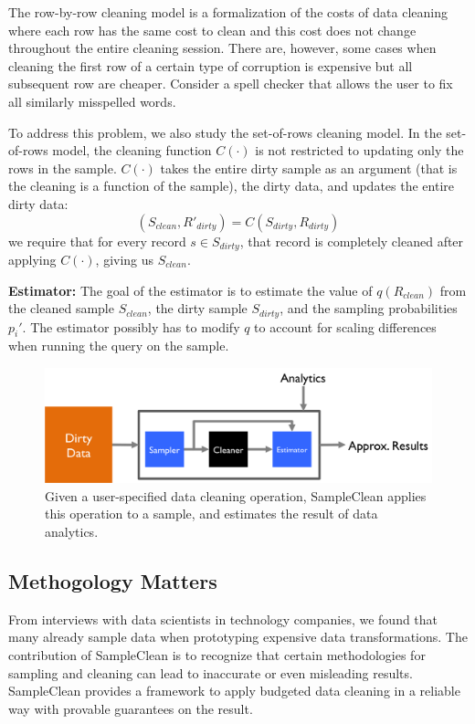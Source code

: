 The row-by-row cleaning model is a formalization of the costs of data cleaning where each row has the same cost to clean and this cost does not change throughout the entire cleaning session.
There are, however, some cases when cleaning the first row of a certain type of corruption is expensive but all subsequent row are cheaper.
Consider a spell checker that allows the user to fix all similarly misspelled words. 

To address this problem, we also study the set-of-rows cleaning model.
In the set-of-rows model, the cleaning function $C(\cdot)$ is not restricted to updating only the rows in the sample.
$C(\cdot)$ takes the entire dirty sample as an argument (that is the cleaning is a function of the sample), the dirty data, and updates the entire dirty data:
\[
(S_{clean}, R'_{dirty}) = C(S_{dirty},R_{dirty})
\]
we require that for every record $s \in S_{dirty}$, that record is completely cleaned after applying $C(\cdot)$, giving us $S_{clean}$.

\vspace{0.5em}
\noindent\textbf{Estimator: } The goal of the estimator is to estimate the value of $q(R_{clean})$ from the cleaned sample $S_{clean}$, the dirty sample $S_{dirty}$, and the sampling probabilities $p_i'$. The estimator possibly has to modify $q$ to account for scaling differences when running the query on the sample.

\begin{figure}
\includegraphics[width=.5\columnwidth]{figs/arch.png}
\caption{Given a user-specified data cleaning operation, SampleClean applies this operation to a sample, and estimates the result of data analytics. \label{fig:arch}}
\end{figure}

\subsection{Methogology Matters}
From interviews with data scientists in technology companies, we found that many already sample data when prototyping expensive data transformations.
The contribution of SampleClean is to recognize that certain methodologies for sampling and cleaning can lead to inaccurate or even misleading results.
SampleClean provides a framework to apply budgeted data cleaning in a reliable way with provable guarantees on the result.

